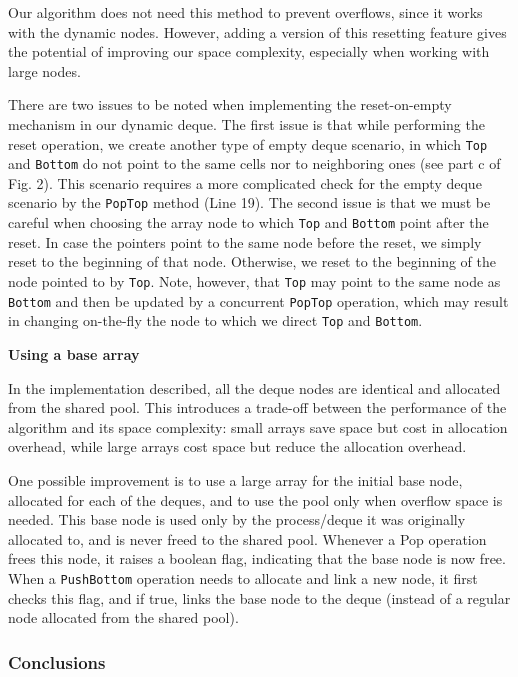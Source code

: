 Our algorithm does not need this method to prevent overflows, since it
works with the dynamic nodes. However, adding a version of this
resetting feature gives the potential of improving our space
complexity, especially when working with large nodes.

There are two issues to be noted when implementing the reset-on-empty
mechanism in our dynamic deque. The first issue is that while
performing the reset operation, we create another type of empty deque
scenario, in which \lstinline!Top! and \lstinline!Bottom! do not point
to the same cells nor to neighboring ones (see part c of Fig. 2). This
scenario requires a more complicated check for the empty deque
scenario by the \lstinline!PopTop! method (Line 19). The second issue
is that we must be careful when choosing the array node to which
\lstinline!Top! and \lstinline!Bottom! point after the reset. In case
the pointers point to the same node before the reset, we simply reset
to the beginning of that node. Otherwise, we reset to the beginning of
the node pointed to by \lstinline!Top!. Note, however, that
\lstinline!Top! may point to the same node as \lstinline!Bottom! and
then be updated by a concurrent \lstinline!PopTop! operation, which
may result in changing on-the-fly the node to which we direct
\lstinline!Top! and \lstinline!Bottom!.

\textbf{Using a base array}

In the implementation described, all the deque nodes are identical and
allocated from the shared pool. This introduces a trade-off between
the performance of the algorithm and its space complexity: small
arrays save space but cost in allocation overhead, while large arrays
cost space but reduce the allocation overhead.

One possible improvement is to use a large array for the initial base
node, allocated for each of the deques, and to use the pool only when
overflow space is needed. This base node is used only by the
process/deque it was originally allocated to, and is never freed to
the shared pool. Whenever a Pop operation frees this node, it raises a
boolean flag, indicating that the base node is now free. When a
\lstinline!PushBottom! operation needs to allocate and link a new
node, it first checks this flag, and if true, links the base node to
the deque (instead of a regular node allocated from the shared pool).

\subsubsection{Conclusions}


